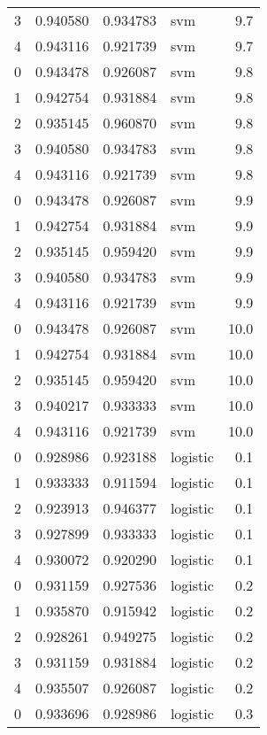 \begin{tabular}{rrrlr}
     3 & 0.940580 & 0.934783 &      svm &        9.7 \\
     4 & 0.943116 & 0.921739 &      svm &        9.7 \\
     0 & 0.943478 & 0.926087 &      svm &        9.8 \\
     1 & 0.942754 & 0.931884 &      svm &        9.8 \\
     2 & 0.935145 & 0.960870 &      svm &        9.8 \\
     3 & 0.940580 & 0.934783 &      svm &        9.8 \\
     4 & 0.943116 & 0.921739 &      svm &        9.8 \\
     0 & 0.943478 & 0.926087 &      svm &        9.9 \\
     1 & 0.942754 & 0.931884 &      svm &        9.9 \\
     2 & 0.935145 & 0.959420 &      svm &        9.9 \\
     3 & 0.940580 & 0.934783 &      svm &        9.9 \\
     4 & 0.943116 & 0.921739 &      svm &        9.9 \\
     0 & 0.943478 & 0.926087 &      svm &       10.0 \\
     1 & 0.942754 & 0.931884 &      svm &       10.0 \\
     2 & 0.935145 & 0.959420 &      svm &       10.0 \\
     3 & 0.940217 & 0.933333 &      svm &       10.0 \\
     4 & 0.943116 & 0.921739 &      svm &       10.0 \\
     0 & 0.928986 & 0.923188 & logistic &        0.1 \\
     1 & 0.933333 & 0.911594 & logistic &        0.1 \\
     2 & 0.923913 & 0.946377 & logistic &        0.1 \\
     3 & 0.927899 & 0.933333 & logistic &        0.1 \\
     4 & 0.930072 & 0.920290 & logistic &        0.1 \\
     0 & 0.931159 & 0.927536 & logistic &        0.2 \\
     1 & 0.935870 & 0.915942 & logistic &        0.2 \\
     2 & 0.928261 & 0.949275 & logistic &        0.2 \\
     3 & 0.931159 & 0.931884 & logistic &        0.2 \\
     4 & 0.935507 & 0.926087 & logistic &        0.2 \\
     0 & 0.933696 & 0.928986 & logistic &        0.3 \\

\end{tabular}

